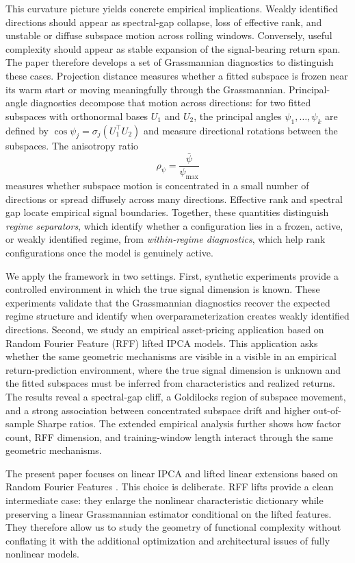 \documentclass[11pt,letterpaper]{article}
\begin{document}
This curvature picture yields concrete empirical implications. Weakly identified directions should appear as spectral-gap collapse, loss of effective rank, and unstable or diffuse subspace motion across rolling windows. Conversely, useful complexity should appear as stable expansion of the signal-bearing return span. The paper therefore develops a set of Grassmannian diagnostics to distinguish these cases. Projection distance measures whether a fitted subspace is frozen near its warm start or moving meaningfully through the Grassmannian. Principal-angle diagnostics decompose that motion across directions: for two fitted
subspaces with orthonormal bases $U_1$ and $U_2$, the principal angles
$\psi_1,\ldots,\psi_k$ are defined by
$\cos\psi_j=\sigma_j(U_1^\top U_2)$ and measure directional rotations between
the subspaces. The anisotropy ratio
\begin{equation*}
\rho_\psi=\frac{\bar\psi}{\psi_{\max}}
\end{equation*}
measures whether subspace motion is concentrated in a small number of directions or spread diffusely across many directions. Effective rank and spectral gap locate empirical signal boundaries. Together, these quantities distinguish \emph{regime separators}, which identify whether a configuration lies in a frozen, active, or weakly identified regime, from \emph{within-regime diagnostics}, which help rank configurations once the model is genuinely active.

We apply the framework in two settings. First, synthetic experiments provide a controlled environment in which the true signal dimension is known. These experiments validate that the Grassmannian diagnostics recover the expected regime structure and identify when overparameterization creates weakly identified directions. Second, we study an empirical asset-pricing application based on Random Fourier Feature (RFF) lifted IPCA models. This application asks whether the same geometric mechanisms are visible in a visible in an empirical return-prediction environment, where the true signal dimension is unknown and the fitted subspaces must be inferred from characteristics and realized returns. The results reveal a spectral-gap cliff, a Goldilocks region of subspace movement, and a strong association between concentrated subspace drift and higher out-of-sample Sharpe ratios. The extended empirical analysis further shows how factor count, RFF dimension, and training-window length interact through the same geometric mechanisms.

The present paper focuses on linear IPCA and lifted linear extensions based on Random Fourier Features \cite{RR07, RR08}. This choice is deliberate. RFF lifts provide a clean intermediate case: they enlarge the nonlinear characteristic dictionary while preserving a linear Grassmannian estimator conditional on the lifted features. They therefore allow us to study the geometry of functional complexity without conflating it with the additional optimization and architectural issues of fully nonlinear models.
\end{document}
